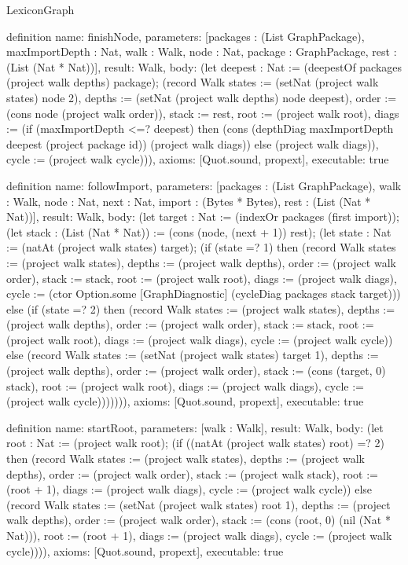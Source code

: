 \begin{lexlean}{LexiconGraph}
\begin{semanticmodule}
definition{
  name: finishNode,
  parameters: [packages : (List GraphPackage), maxImportDepth : Nat, walk : Walk, node : Nat, package : GraphPackage, rest : (List (Nat * Nat))],
  result: Walk,
  body: (let deepest : Nat := (deepestOf packages (project walk depths) package); (record Walk {states := (setNat (project walk states) node 2), depths := (setNat (project walk depths) node deepest), order := (cons node (project walk order)), stack := rest, root := (project walk root), diags := (if (maxImportDepth <=? deepest) then (cons (depthDiag maxImportDepth deepest (project package id)) (project walk diags)) else (project walk diags)), cycle := (project walk cycle)})),
  axioms: [Quot.sound, propext],
  executable: true
}

definition{
  name: followImport,
  parameters: [packages : (List GraphPackage), walk : Walk, node : Nat, next : Nat, import : (Bytes * Bytes), rest : (List (Nat * Nat))],
  result: Walk,
  body: (let target : Nat := (indexOr packages (first import)); (let stack : (List (Nat * Nat)) := (cons (node, (next + 1)) rest); (let state : Nat := (natAt (project walk states) target); (if (state =? 1) then (record Walk {states := (project walk states), depths := (project walk depths), order := (project walk order), stack := stack, root := (project walk root), diags := (project walk diags), cycle := (ctor Option.some [GraphDiagnostic] (cycleDiag packages stack target))}) else (if (state =? 2) then (record Walk {states := (project walk states), depths := (project walk depths), order := (project walk order), stack := stack, root := (project walk root), diags := (project walk diags), cycle := (project walk cycle)}) else (record Walk {states := (setNat (project walk states) target 1), depths := (project walk depths), order := (project walk order), stack := (cons (target, 0) stack), root := (project walk root), diags := (project walk diags), cycle := (project walk cycle)})))))),
  axioms: [Quot.sound, propext],
  executable: true
}

definition{
  name: startRoot,
  parameters: [walk : Walk],
  result: Walk,
  body: (let root : Nat := (project walk root); (if ((natAt (project walk states) root) =? 2) then (record Walk {states := (project walk states), depths := (project walk depths), order := (project walk order), stack := (project walk stack), root := (root + 1), diags := (project walk diags), cycle := (project walk cycle)}) else (record Walk {states := (setNat (project walk states) root 1), depths := (project walk depths), order := (project walk order), stack := (cons (root, 0) (nil (Nat * Nat))), root := (root + 1), diags := (project walk diags), cycle := (project walk cycle)}))),
  axioms: [Quot.sound, propext],
  executable: true
}


\end{semanticmodule}
\end{lexlean}
